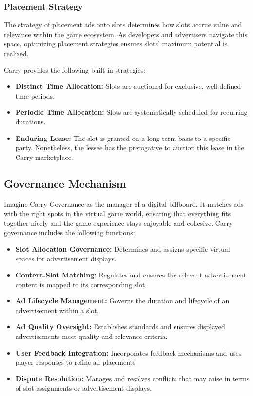 \subsubsection{Placement Strategy}
The strategy of placement ads onto slots determines how slots accrue value and relevance within the game ecosystem. As developers and advertisers navigate this space, optimizing placement strategies ensures slots' maximum potential is realized. 

Carry provides the following built in strategies:
\begin{itemize}
    \item \textbf{Distinct Time Allocation:} Slots are auctioned for exclusive, well-defined time periods.
    
    \item \textbf{Periodic Time Allocation:} Slots are systematically scheduled for recurring durations.
    
    \item \textbf{Enduring Lease:} The slot is granted on a long-term basis to a specific party. Nonetheless, the lessee has the prerogative to auction this lease in the Carry marketplace.
\end{itemize}




\subsection{Governance Mechanism}

Imagine Carry Governance as the manager of a digital billboard. It matches ads with the right spots in the virtual game world, ensuring that everything fits together nicely and the game experience stays enjoyable and cohesive. Carry governance includes the following functions:

\begin{itemize}
    \item \textbf{Slot Allocation Governance:} Determines and assigns specific virtual spaces for advertisement displays.
    
    \item \textbf{Content-Slot Matching:} Regulates and ensures the relevant advertisement content is mapped to its corresponding slot.

    \item \textbf{Ad Lifecycle Management:} Governs the duration and lifecycle of an advertisement within a slot.

    \item \textbf{Ad Quality Oversight:} Establishes standards and ensures displayed advertisements meet quality and relevance criteria.
    
    \item \textbf{User Feedback Integration:} Incorporates feedback mechanisms and uses player responses to refine ad placements.

    \item \textbf{Dispute Resolution:} Manages and resolves conflicts that may arise in terms of slot assignments or advertisement displays.
\end{itemize}



